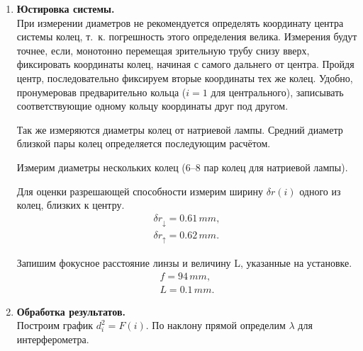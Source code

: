 \begin{enumerate}

    \item 
    
    \textbf{Юстировка системы.}\\
    
    При измерении диаметров не рекомендуется определять координату центра системы колец, т.~к. погрешность этого определения велика. Измерения будут точнее, если, монотонно перемещая зрительную трубу снизу вверх, фиксировать координаты колец, начиная с самого дальнего от центра. Пройдя центр, последовательно фиксируем вторые координаты тех же колец. Удобно, пронумеровав предварительно кольца ($i = 1$ для центрального), записывать соответствующие одному кольцу координаты друг под другом.
    
    Так же измеряются диаметры колец от натриевой лампы. Средний диаметр близкой пары колец определяется последующим расчётом. 
    
    Измерим диаметры нескольких колец (6–8 пар колец для натриевой лампы).
    
    Для оценки разрешающей способности измерим ширину $\delta r(i)$ одного из колец, близких к центру.
    \begin{gather*}
        \delta r_{\downarrow} = 0.61 \, mm,\\
        \delta r_{\uparrow} = 0.62 \, mm.
    \end{gather*}
    
    Запишим фокусное расстояние линзы и величину L, указанные на установке.
    \begin{gather*}
        f = 94 \, mm,\\
        L = 0.1 \, mm.
    \end{gather*}
    
    \item 

    \textbf{Обработка результатов.}\\
    
    Построим график $d_i^2 = F(i)$. По наклону прямой определим $\lambda$ для интерферометра. \\
    \begin{figure}[h]
    \end{figure}
    

\end{enumerate}
